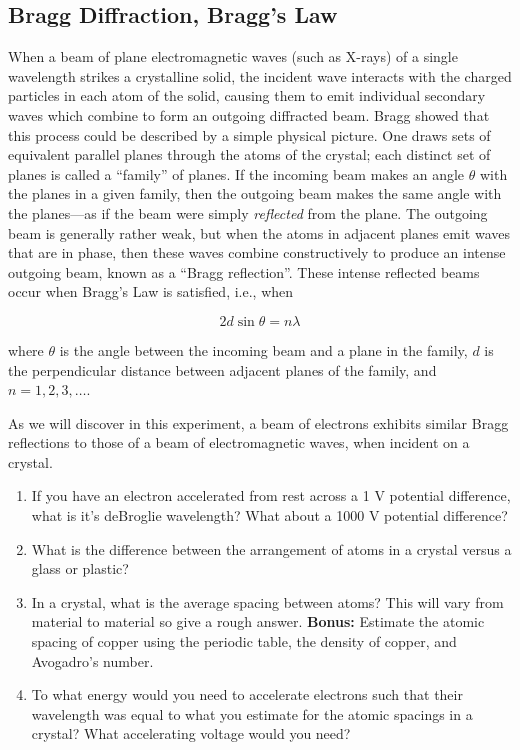 \documentclass{tufte-handout}
\begin{document}
\subsection{Bragg Diffraction, Bragg's Law}

When a beam of plane electromagnetic waves (such as X-rays) of a single
wavelength strikes a crystalline solid, the incident wave interacts with the
charged particles in each atom of the solid, causing them to emit individual
secondary waves which combine to form an outgoing diffracted beam.  Bragg showed
that this process could be described by a simple physical picture.  One draws
sets of equivalent parallel planes through the atoms of the crystal; each
distinct set of planes is called a ``family'' of planes.  If the incoming beam
makes an angle $\theta$ with the planes in a given family, then the outgoing
beam makes the same angle with the planes---as if the beam were simply {\em
  reflected} from the plane.  The outgoing beam is generally rather weak, but
when the atoms in adjacent planes emit waves that are in phase, then these waves
combine constructively to produce an intense outgoing beam, known as a ``Bragg
reflection''.  These intense reflected beams occur when Bragg's Law is
satisfied, i.e., when

\begin{equation}
2 d \sin\theta = n\lambda
\label{eq:bragglaw}
\end{equation}

\noindent where $\theta$ is the angle between the incoming beam and a plane in
the family, $d$ is the perpendicular distance between adjacent planes of the
family, and $n = 1,2,3,\ldots$.

As we will discover in this experiment, a beam of electrons exhibits
similar Bragg reflections to those of a beam of electromagnetic waves,
when incident on a crystal.

\begin{enumerate}
\item If you have an electron accelerated from rest across a 1 V potential difference, what is it's deBroglie wavelength? 
What about a 1000 V potential difference?

\item What is the difference between the arrangement of atoms in a crystal versus a glass or plastic?

\item In a crystal, what is the average spacing between atoms? This will vary from material to material 
so give a rough answer. {\bf Bonus:} Estimate the atomic spacing of copper using the periodic table, the density of copper, and Avogadro's number.

\item To what energy would you need to accelerate electrons such that their wavelength was equal to
what you estimate for the atomic spacings in a crystal?  What accelerating voltage would you need?

\end{enumerate}
\end{document}

